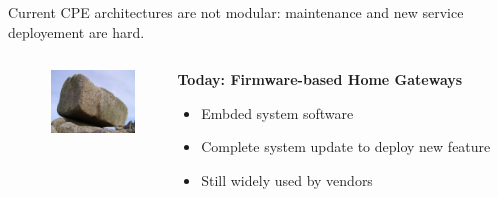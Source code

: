 \documentclass[a4paper]{beamer}
\begin{document}
\begin{frame}{Current CPE architectures are not modular: maintenance and new service deployement are hard.}
								
	\begin{columns}[T]
		\begin{column}{.01\textwidth} %
		\end{column}
		\begin{column}[T]{0.15 \textwidth} 
			\vspace{1em}
			\includegraphics[width=6em]{monolith.jpg}
		\end{column}
																		
																						
		\begin{column}[T]{0.70 \textwidth} 
																																	
																																		   
			\textbf{Today: Firmware-based Home Gateways}
			\begin{itemize}
				\item Embded system software
				\item Complete system update to deploy new feature
				\item Still widely used by vendors
			\end{itemize}
			\vspace{5mm}
																																		     
																																	
		\end{column}
																						
	\end{columns}
								
							
									
\end{frame}
\end{document}

